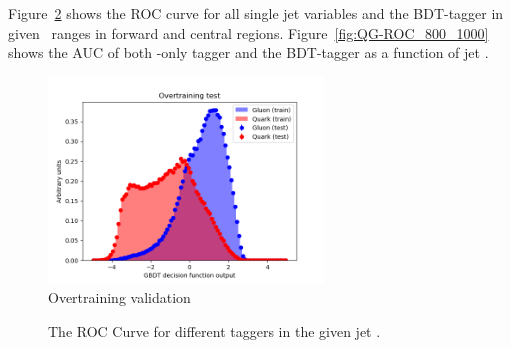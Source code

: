 Figure~\ref{fig:QG-ROC_500_600} shows the ROC curve for all single jet variables and the BDT-tagger in given \pt~ranges in forward and central regions. Figure~\ref{fig:QG-ROC_800_1000}  shows the AUC of both \ntrk-only tagger and the BDT-tagger as a function of jet \pt. 
\begin{figure}[h]
	\centering
	\includegraphics[width=0.65\textwidth]{fig/ADE/new_GBDT/4vars_plots/overtrain_validation.png}
	\caption{Overtraining validation}
	\label{fig:overtraining-validation}
\end{figure}

\begin{figure}[htb]
	\centering
	 \quad
	\caption[]{
		The ROC Curve for different taggers in the given jet \pt. %
		\label{fig:QG-ROC_500_600}
	}
\end{figure}


